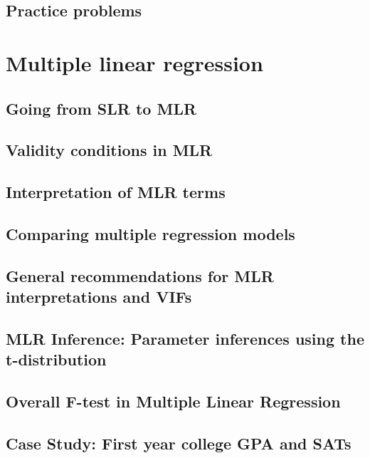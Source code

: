 \documentclass[]{book}
\begin{document}
{{\section{Practice problems}\label{section7-9}

\chapter{Multiple linear regression}\label{chapter8}

\section{Going from SLR to MLR}\label{section8-1}

\section{Validity conditions in MLR}\label{section8-2}

\section{Interpretation of MLR terms}\label{section8-3}

\section{Comparing multiple regression models}\label{section8-4}

\section{General recommendations for MLR interpretations and
VIFs}\label{section8-5}

\section{MLR Inference: Parameter inferences using the
t-distribution}\label{section8-6}

\section{Overall F-test in Multiple Linear Regression}\label{section8-7}

\section{Case Study: First year college GPA and SATs}\label{section8-8}

}}
\end{document}
